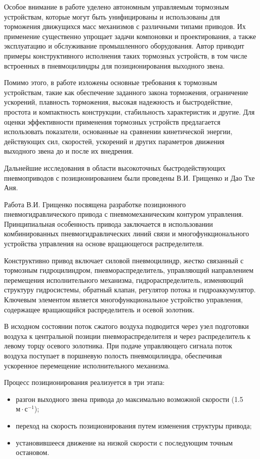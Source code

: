 Особое внимание в работе уделено автономным управляемым тормозным устройствам, которые могут быть унифицированы
и использованы для торможения движущихся масс механизмов с различными типами приводов. Их применение существенно
упрощает задачи компоновки и проектирования, а также эксплуатацию и обслуживание промышленного оборудования.
Автор приводит примеры конструктивного исполнения таких тормозных устройств, в том числе встроенных в пневмоцилиндры
для позиционирования выходного звена.

Помимо этого, в работе изложены основные требования к тормозным устройствам, такие как обеспечение заданного закона
торможения, ограничение ускорений, плавность торможения, высокая надежность и быстродействие, простота и компактность
конструкции, стабильность характеристик и другие. Для оценки эффективности применения тормозных устройств предлагается
использовать показатели, основанные на сравнении кинетической энергии, действующих сил, скоростей, ускорений и других
параметров движения выходного звена до и после их внедрения.

Дальнейшие исследования в области высокоточных быстродействующих пневмоприводов с позиционированием были проведены
В.И. Грищенко и Дао Тхе Аня.

Работа В.И. Грищенко \cite{Grishchenko2010} посвящена разработке позиционного пневмогидравлического привода
с пневмомеханическим контуром управления. Принципиальная особенность привода
заключается в использовании комбинированных пневмогидравлических линий связи и
многофункционального устройства управления на основе вращающегося распределителя.

Конструктивно привод включает силовой пневмоцилиндр, жестко связанный с тормозным
гидроцилиндром, пневмораспределитель, управляющий направлением перемещения исполнительного
механизма, гидрораспределитель, изменяющий структуру гидросистемы, обратный клапан,
регулятор потока и гидроаккумулятор. Ключевым элементом является многофункциональное
устройство управления, содержащее вращающийся распределитель и осевой золотник.

В исходном состоянии поток сжатого воздуха подводится через узел подготовки воздуха к
центральной позиции пневмораспределителя и через распределитель к левому торцу осевого
золотника. При подаче управляющего сигнала поток воздуха поступает в поршневую полость
пневмоцилиндра, обеспечивая ускоренное перемещение исполнительного механизма.

Процесс позиционирования реализуется в три этапа:
\begin{itemize}
	\item разгон выходного звена привода до максимально возможной скорости (\num{1,5}~$\text{м}\cdot\text{с}^{-1}$);
	\item переход на скорость позиционирования путем изменения структуры привода;
	\item установившееся движение на низкой скорости с последующим точным остановом.
\end{itemize}

